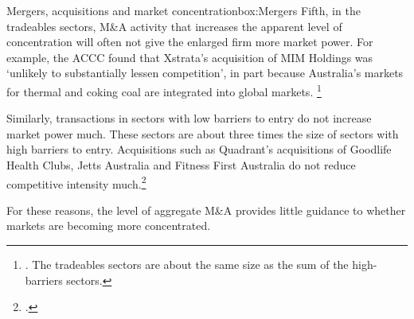 \begin{bigbox}{Mergers, acquisitions and market concentration}{box:Mergers}
Fifth, in the tradeables sectors, M\&A activity that increases the apparent level of concentration will often not give the enlarged firm more market power. For example, the ACCC found that Xstrata's acquisition of MIM Holdings was `unlikely to substantially lessen competition', in part because Australia's markets for thermal and coking coal are integrated into global markets.%
  \footnote{\textcite{ACCC_Xstrata}. The tradeables sectors are about the same size as the sum of the high-barriers sectors.}

Similarly, transactions in sectors with low barriers to entry do not increase market power much. These sectors are about three times the size of sectors with high barriers to entry. Acquisitions such as Quadrant's acquisitions of Goodlife Health Clubs, Jetts Australia and Fitness First Australia do not reduce competitive intensity much.\footcite{ACCC_Fitness}

For these reasons, the level of aggregate M\&A provides little guidance to whether markets are becoming more concentrated.



    

\end{bigbox}
